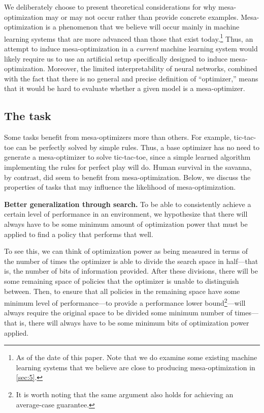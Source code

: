 \documentclass[
  onecolumn,
  natbib,
]{miri-tech-article}
\begin{document}
We deliberately choose to present theoretical considerations for why mesa-optimization may or may not occur rather than provide concrete examples. Mesa-optimization is a phenomenon that we believe will occur mainly in machine learning systems that are more advanced than those that exist today.\footnote{As of the date of this paper. Note that we do examine some existing machine learning systems that we believe are close to producing mesa-optimization in \cref{sec:5}.} Thus, an attempt to induce mesa-optimization in a \textit{current} machine learning system would likely require us to use an artificial setup specifically designed to induce mesa-optimization. Moreover, the limited interpretability of neural networks, combined with the fact that there is no general and precise definition of ``optimizer,'' means that it would be hard to evaluate whether a given model is a mesa-optimizer.

\subsection{The task}
\label{sec:2.1}

Some tasks benefit from mesa-optimizers more than others. For example, tic-tac-toe can be perfectly solved by simple rules. Thus, a base optimizer has no need to generate a mesa-optimizer to solve tic-tac-toe, since a simple learned algorithm implementing the rules for perfect play will do. Human survival in the savanna, by contrast, did seem to benefit from mesa-optimization. Below, we discuss the properties of tasks that may influence the likelihood of mesa-optimization.

\textbf{Better generalization through search.} To be able to consistently achieve a certain level of performance in an environment, we hypothesize that there will always have to be some minimum amount of optimization power that must be applied to find a policy that performs that well.

To see this, we can think of optimization power as being measured in terms of the number of times the optimizer is able to divide the search space in half---that is, the number of bits of information provided.\cite{optpow} After these divisions, there will be some remaining space of policies that the optimizer is unable to distinguish between. Then, to ensure that all policies in the remaining space have some minimum level of performance---to provide a performance lower bound\footnote{It is worth noting that the same argument also holds for achieving an average-case guarantee.}---will always require the original space to be divided some minimum number of times---that is, there will always have to be some minimum bits of optimization power applied.
\end{document}
